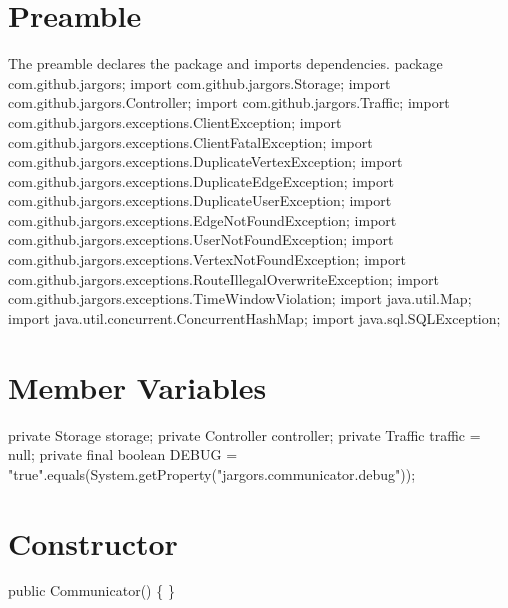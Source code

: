 \section{Preamble}
The preamble declares the package and imports dependencies.
\nwenddocs{}\endmoddef{}
package com.github.jargors;
\nwendcode{}\nwdocspar
\nwenddocs{}\plusendmoddef
import com.github.jargors.Storage;
import com.github.jargors.Controller;
import com.github.jargors.Traffic;
import com.github.jargors.exceptions.ClientException;
import com.github.jargors.exceptions.ClientFatalException;
import com.github.jargors.exceptions.DuplicateVertexException;
import com.github.jargors.exceptions.DuplicateEdgeException;
import com.github.jargors.exceptions.DuplicateUserException;
import com.github.jargors.exceptions.EdgeNotFoundException;
import com.github.jargors.exceptions.UserNotFoundException;
import com.github.jargors.exceptions.VertexNotFoundException;
import com.github.jargors.exceptions.RouteIllegalOverwriteException;
import com.github.jargors.exceptions.TimeWindowViolation;
import java.util.Map;
import java.util.concurrent.ConcurrentHashMap;
import java.sql.SQLException;
\nwendcode{}\nwdocspar

\section{Member Variables}
\nwenddocs{}\endmoddef{}
private Storage storage;
private Controller controller;
private Traffic traffic = null;
private final boolean DEBUG = "true".equals(System.getProperty("jargors.communicator.debug"));
\nwendcode{}\nwdocspar

\section{Constructor}
\nwenddocs{}\endmoddef{}
public Communicator() \{ \}
\nwendcode{}\nwdocspar

